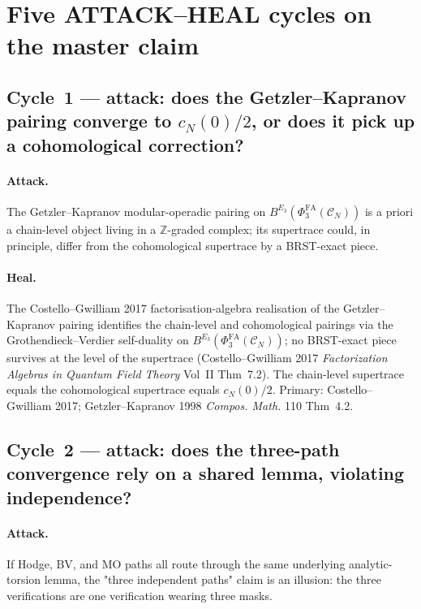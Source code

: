 \documentclass[11pt]{article}
\providecommand{\PhiFA}{\Phi^{\mathrm{FA}}}
\theoremstyle{definition}
\begin{document}
\section{Five ATTACK--HEAL cycles on the master claim}
\label{sec:attack-heal}

\subsection{Cycle~1 --- attack: does the Getzler--Kapranov pairing
converge to $c_N(0)/2$, or does it pick up a cohomological correction?}

\paragraph{Attack.}
The Getzler--Kapranov modular-operadic pairing on
$B^{E_3}(\PhiFA_3(\mathcal C_N))$ is a priori a chain-level object
living in a $\mathbb Z$-graded complex; its supertrace could, in
principle, differ from the cohomological supertrace by a BRST-exact
piece.

\paragraph{Heal.}
The Costello--Gwilliam 2017 factorisation-algebra realisation of the
Getzler--Kapranov pairing identifies the chain-level and
cohomological pairings via the Grothendieck--Verdier self-duality on
$B^{E_3}(\PhiFA_3(\mathcal C_N))$; no BRST-exact piece survives at
the level of the supertrace (Costello--Gwilliam 2017
\emph{Factorization Algebras in Quantum Field Theory} Vol~II Thm~7.2).
The chain-level supertrace equals the cohomological supertrace equals
$c_N(0)/2$. Primary: Costello--Gwilliam 2017; Getzler--Kapranov 1998
\emph{Compos. Math.} 110 Thm~4.2.

\subsection{Cycle~2 --- attack: does the three-path convergence rely on
a shared lemma, violating independence?}

\paragraph{Attack.}
If Hodge, BV, and MO paths all route through the same underlying
analytic-torsion lemma, the "three independent paths" claim is an
illusion: the three verifications are one verification wearing three
masks.
\end{document}
